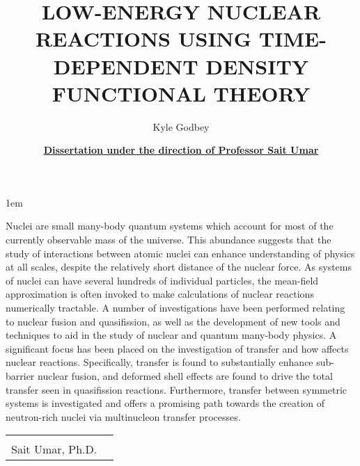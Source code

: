 \documentclass[12pt,letterpaper,doublespace]{article}
\title{\normalsize LOW-ENERGY NUCLEAR REACTIONS USING TIME-DEPENDENT DENSITY FUNCTIONAL THEORY}
\author{\normalsize Kyle Godbey}
\date{\normalsize\underline{\textbf{Dissertation under the direction of Professor Sait Umar}}}
\begin{document}
\maketitle
\thispagestyle{fancy}

\openup 1em

Nuclei are small many-body quantum systems which account for most of the currently observable mass of the universe.
This abundance suggests that the study of interactions between atomic nuclei can enhance understanding of physics at all scales, despite the relatively short distance of the nuclear force.
As systems of nuclei can have several hundreds of individual particles, the mean-field approximation is often invoked to make calculations of nuclear reactions numerically tractable.
A number of investigations have been performed relating to nuclear fusion and quasifission, as well as the development of new tools and techniques to aid in the study of nuclear and quantum many-body physics.
A significant focus has been placed on the investigation of transfer and how affects nuclear reactions.
Specifically, transfer is found to substantially enhance sub-barrier nuclear fusion, and deformed shell effects are found to drive the total transfer seen in quasifission reactions.
Furthermore, transfer between symmetric systems is investigated and offers a promising path towards the creation of neutron-rich nuclei via multinucleon transfer processes.




\vspace{120pt}
\noindent\begin{tabular}{ll}
	\makebox[4.0in]{Approved \hrulefill} & \makebox[1.5in]{Date \hrulefill}\\
	\hspace{130px}Sait Umar, Ph.D.
\end{tabular}
\end{document}
